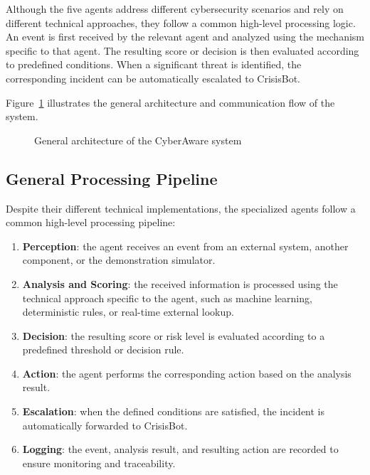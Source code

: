 \documentclass[12pt,a4paper]{report}
\newcommand{\ProjectName}{CyberAware}
\begin{document}
Although the five agents address different cybersecurity scenarios and rely on different technical approaches, they follow a common high-level processing logic. An event is first received by the relevant agent and analyzed using the mechanism specific to that agent. The resulting score or decision is then evaluated according to predefined conditions. When a significant threat is identified, the corresponding incident can be automatically escalated to CrisisBot.

Figure~\ref{fig:architecture} illustrates the general architecture and communication flow of the system.

\begin{figure}[H]
\centering
\caption{General architecture of the \ProjectName{} system}
\label{fig:architecture}
\end{figure}

\subsection{General Processing Pipeline}

Despite their different technical implementations, the specialized agents follow a common high-level processing pipeline:

\begin{enumerate}[nosep]
    \item \textbf{Perception}: the agent receives an event from an external
    system, another component, or the demonstration simulator.

    \item \textbf{Analysis and Scoring}: the received information is
    processed using the technical approach specific to the agent, such as
    machine learning, deterministic rules, or real-time external lookup.

    \item \textbf{Decision}: the resulting score or risk level is evaluated
    according to a predefined threshold or decision rule.

    \item \textbf{Action}: the agent performs the corresponding action based
    on the analysis result.

    \item \textbf{Escalation}: when the defined conditions are satisfied,
    the incident is automatically forwarded to CrisisBot.

    \item \textbf{Logging}: the event, analysis result, and resulting action
    are recorded to ensure monitoring and traceability.

\end{enumerate}
\end{document}
